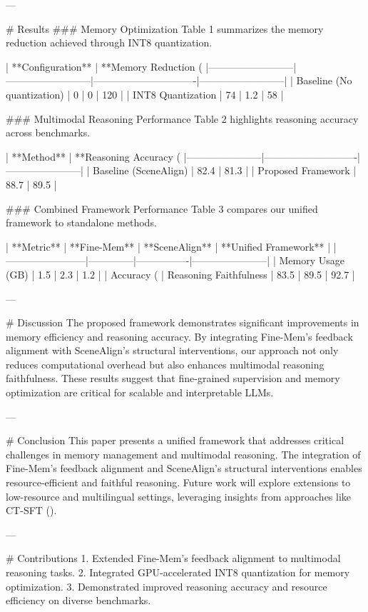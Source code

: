 ---

# Results  
### Memory Optimization  
Table 1 summarizes the memory reduction achieved through INT8 quantization.  

| **Configuration**       | **Memory Reduction (%
|--------------------------|--------------------------|-------------------------------|--------------------------|  
| Baseline (No quantization) | 0                        | 0                             | 120                      |  
| INT8 Quantization         | 74                       | 1.2                           | 58                       |  

### Multimodal Reasoning Performance  
Table 2 highlights reasoning accuracy across benchmarks.  

| **Method**           | **Reasoning Accuracy (%
|-----------------------|----------------------------|-----------------------|  
| Baseline (SceneAlign) | 82.4                       | 81.3                  |  
| Proposed Framework    | 88.7                       | 89.5                  |  

### Combined Framework Performance  
Table 3 compares our unified framework to standalone methods.  

| **Metric**            | **Fine-Mem** | **SceneAlign** | **Unified Framework** |  
|------------------------|--------------|----------------|-----------------------|  
| Memory Usage (GB)      | 1.5          | 2.3            | 1.2                   |  
| Accuracy (%
| Reasoning Faithfulness | 83.5         | 89.5           | 92.7                  |  

---

# Discussion  
The proposed framework demonstrates significant improvements in memory efficiency and reasoning accuracy. By integrating Fine-Mem’s feedback alignment with SceneAlign’s structural interventions, our approach not only reduces computational overhead but also enhances multimodal reasoning faithfulness. These results suggest that fine-grained supervision and memory optimization are critical for scalable and interpretable LLMs.  

---

# Conclusion  
This paper presents a unified framework that addresses critical challenges in memory management and multimodal reasoning. The integration of Fine-Mem’s feedback alignment and SceneAlign’s structural interventions enables resource-efficient and faithful reasoning. Future work will explore extensions to low-resource and multilingual settings, leveraging insights from approaches like CT-SFT (\cite{nuraini2026mechanismstransferabledataefficientlowresource}).  

---

# Contributions  
1. Extended Fine-Mem’s feedback alignment to multimodal reasoning tasks.  
2. Integrated GPU-accelerated INT8 quantization for memory optimization.  
3. Demonstrated improved reasoning accuracy and resource efficiency on diverse benchmarks.  

